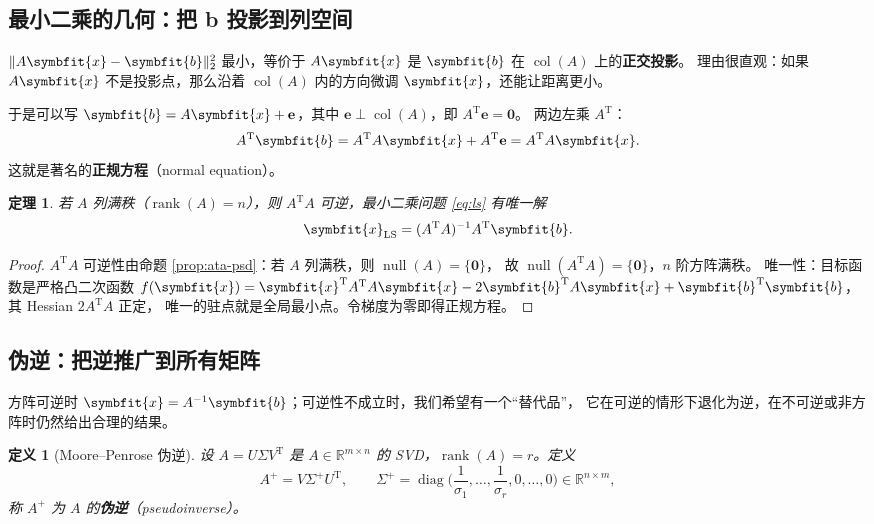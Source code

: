\documentclass[UTF8, 11pt, a4paper, fontset=windows]{ctexart}
\theoremstyle{cnthm}
\newtheorem{thm}{定理}[section]
\theoremstyle{cndef}
\newtheorem{defn}{定义}[section]
\newcommand{\T}{^{\mathrm{T}}}
\newcommand{\R}{\mathbb{R}}
\newcommand{\nrm}[1]{\lVert #1 \rVert}
\DeclareMathOperator{\rank}{rank}
\DeclareMathOperator{\diag}{diag}
\DeclareMathOperator{\Null}{null}
\DeclareMathOperator{\Col}{col}
\newcommand{\x}{\symbfit{x}}
\newcommand{\bb}{\symbfit{b}}
\begin{document}
\subsection{最小二乘的几何：把 b 投影到列空间}

$\nrm{A\x-\bb}_2^2$ 最小，等价于 $A\x$ 是 $\bb$ 在 $\Col(A)$ 上的\textbf{正交投影}。
理由很直观：如果 $A\x$ 不是投影点，那么沿着 $\Col(A)$ 内的方向微调 $\x$，还能让距离更小。

于是可以写 $\bb=A\x+\mathbf{e}$，其中 $\mathbf{e}\perp\Col(A)$，即 $A\T\mathbf{e}=\mathbf{0}$。
两边左乘 $A\T$：
\begin{equation}
  A\T\bb=A\T A\x+A\T\mathbf{e}=A\T A\x .
\end{equation}
这就是著名的\textbf{正规方程}（normal equation）。

\begin{thm}\label{thm:normal-eq}
若 $A$ 列满秩（$\rank(A)=n$），则 $A\T A$ 可逆，最小二乘问题 \eqref{eq:ls} 有唯一解
\begin{equation}
  \x_{\mathrm{LS}}=(A\T A)^{-1}A\T\bb .
\end{equation}
\end{thm}

\begin{proof}
$A\T A$ 可逆性由命题 \ref{prop:ata-psd}：若 $A$ 列满秩，则 $\Null(A)=\{\mathbf{0}\}$，
故 $\Null(A\T A)=\{\mathbf{0}\}$，$n$ 阶方阵满秩。
唯一性：目标函数是严格凸二次函数
$f(\x)=\x\T A\T A\x-2\bb\T A\x+\bb\T\bb$，其 Hessian $2A\T A$ 正定，
唯一的驻点就是全局最小点。令梯度为零即得正规方程。
\end{proof}

\subsection{伪逆：把逆推广到所有矩阵}

方阵可逆时 $\x=A^{-1}\bb$；可逆性不成立时，我们希望有一个“替代品”，
它在可逆的情形下退化为逆，在不可逆或非方阵时仍然给出合理的结果。

\begin{defn}[Moore--Penrose 伪逆]\label{def:pinv}
设 $A=U\Sigma V\T$ 是 $A\in\R^{m\times n}$ 的 SVD，$\rank(A)=r$。定义
\begin{equation}
  A^{+}=V\Sigma^{+}U\T,\qquad
  \Sigma^{+}=\diag\Big(\frac{1}{\sigma_1},\dots,\frac{1}{\sigma_r},0,\dots,0\Big)\in\R^{n\times m},
\end{equation}
称 $A^{+}$ 为 $A$ 的\textbf{伪逆}（pseudoinverse）。
\end{defn}
\end{document}
